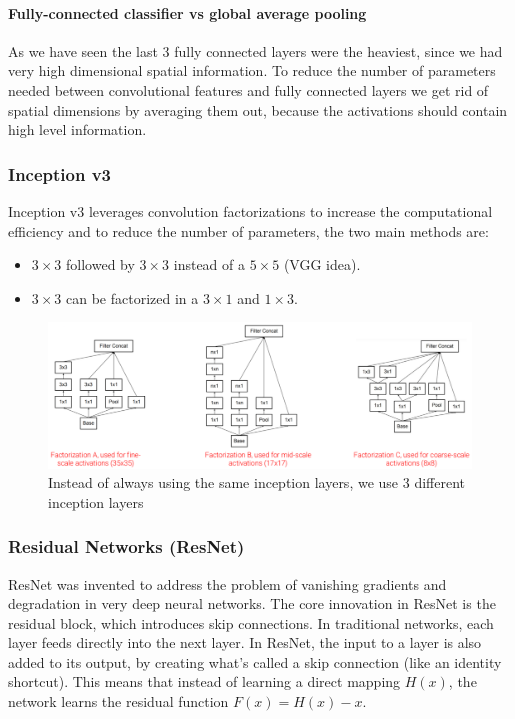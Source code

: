 \documentclass{article}
\begin{document}
\paragraph{Fully-connected classifier vs global average pooling}
As we have seen the last 3 fully connected layers were the heaviest, since we had very high dimensional spatial information.
To reduce the number of parameters needed between convolutional features and fully connected layers we get rid of spatial dimensions by averaging them out, because the activations should contain high level information.

\subsubsection{Inception v3}
Inception v3 leverages convolution factorizations to increase the computational efficiency and to reduce the number of parameters, the two main methods are:
\begin{itemize}
  \item $3 \times 3$ followed by $3 \times 3$ instead of a $5 \times 5$ (VGG idea).
  \item $3 \times 3$ can be factorized in a $3\times 1$ and $1 \times 3$.
\end{itemize}

\begin{figure}[htbp]
  \centering
  \includegraphics[width=0.8\linewidth]{./img/inception3.png}
  \caption{Instead of always using the same inception layers, we use 3 different inception layers}
\end{figure}

\subsubsection{Residual Networks (ResNet)}
ResNet was invented to address the problem of vanishing gradients and degradation in very deep neural networks.
The core innovation in ResNet is the residual block, which introduces skip connections.
In traditional networks, each layer feeds directly into the next layer.
In ResNet, the input to a layer is also added to its output, by creating what's called a skip connection (like an identity shortcut).
This means that instead of learning a direct mapping $H(x)$, the network learns the residual function $F(x) = H(x) - x$.
\end{document}
